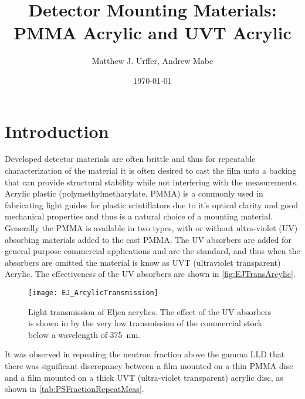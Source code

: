\documentclass[draftcls,onecolumn]{IEEEtran}
\begin{document}
\title{Detector Mounting Materials: PMMA Acrylic and UVT Acrylic}
\author{Matthew J. Urffer, Andrew Mabe}
\date{\today}
\maketitle

\listoftodos
\tableofcontents
\listoffigures
\listoftables
\lstlistoflistings
\section{Introduction}
Developed detector materials are often brittle and thus for repeatable characterization of the material it is often desired to cast the film unto a backing that can provide structural stability while not interfering with the measurements.
Acrylic plastic (polymethylmetharylate, PMMA) is a commonly used in fabricating light guides for plastic scintillators due to it's optical clarity and good mechanical properties and thus is a natural choice of a mounting material.
Generally the PMMA is available in two types, with or without ultra-violet (UV) absorbing materials added to the cast PMMA.
The UV absorbers are added for general purpose commercial applications and are the standard, and thus when the absorbers are omitted the material is know as UVT (ultraviolet transparent) Acrylic.
The effectiveness of the UV absorbers are shown in \autoref{fig:EJTransArcylic}.
\begin{figure}
  \centering
  \texttt{[image: EJ\_ArcylicTransmission]}
	\caption[Light Transmission of Eljen Acrylics (Eljen)]{Light transmission of Eljen acrylics.  The effect of the UV absorbers is shown in by the very low transmission of the commercial stock below a wavelength of \SI{375}{\nm}.}
	\label{fig:EJTransArcylic}
\end{figure}	
It was observed in repeating the neutron fraction above the gamma LLD that there was significant discrepancy between a film mounted on a thin PMMA disc and a film mounted on a thick UVT (ultra-violet transparent) acrylic disc, as shown in \autoref{tab:PSFractionRepeatMeas}.
\end{document}
